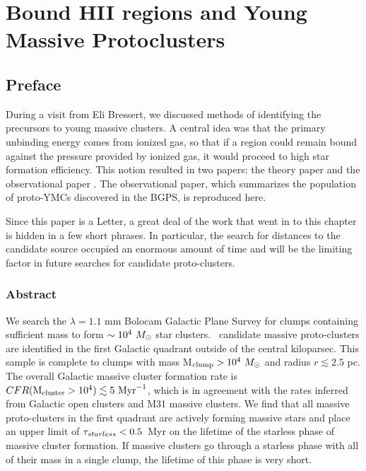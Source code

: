 
%
\chapter{Bound HII regions and Young Massive Protoclusters}
\label{ch:ympc}



\section{Preface}
During a visit from Eli Bressert, we discussed methods of identifying the
precursors to young massive clusters.  A central idea was that the primary
unbinding energy comes from ionized gas, so that if a region could remain
bound against the pressure provided by ionized gas, it would proceed to
high star formation efficiency.  This notion resulted in two papers: the theory
paper \citep{Bressert2012} and the observational paper \citep{Ginsburg2012a}.
The observational paper, which summarizes the population of proto-YMCs discovered
in the BGPS, is reproduced here.

Since this paper is a Letter, a great deal of the work that went in to this
chapter is hidden in a few short phrases.  In particular, the search for
distances to the candidate source occupied an enormous amount of time and will
be the limiting factor in future searches for candidate proto-clusters.

\subsection{Abstract}
    
We search the $\lambda=1.1$ mm Bolocam Galactic Plane Survey for clumps
containing sufficient mass to form $\sim10^4~M_{\odot}$ star clusters.
\ncandidates\ candidate massive proto-clusters  are identified in the first Galactic quadrant outside
of the central kiloparsec.  This
sample is complete to clumps with mass M$_{\rm clump}>10^4~M_{\odot}$ and radius
$r\lesssim2.5$ pc.  The overall Galactic massive cluster formation rate is
$CFR({\rm M}_{\rm cluster}>10^4) \lesssim 5\  \mathrm{Myr}^{-1}$, which is in
agreement with the rates inferred from Galactic open clusters and M31 massive
clusters.  We find that all massive proto-clusters in the first quadrant are
actively forming massive stars and place an upper limit of
$\tau_{starless}<0.5$~Myr on the lifetime of the starless phase of massive
cluster formation.  If massive clusters go through a starless phase with all 
of their mass in a single clump, the lifetime of this phase is very short.




